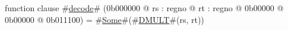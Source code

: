 function clause #\hyperref[zdecode]{decode}# (0b000000 @ rs : regno @ rt : regno @ 0b00000 @ 0b00000 @ 0b011100) =
  #\hyperref[zSome]{Some}#(#\hyperref[zDMULT]{DMULT}#(rs, rt))
